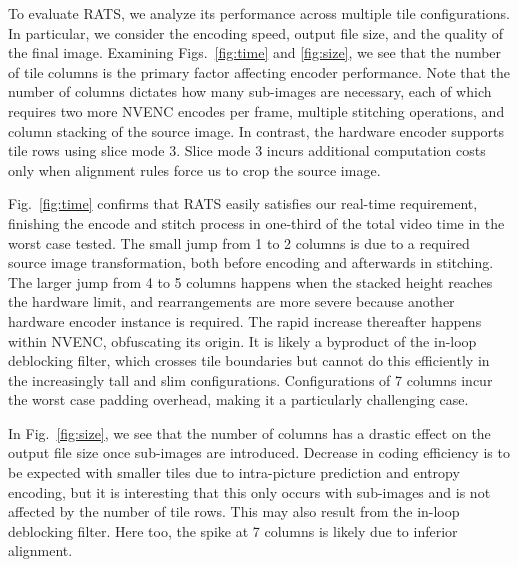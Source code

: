 To evaluate RATS, we analyze its performance across multiple tile configurations. In particular, we consider the encoding speed, output file size, and the quality of the final image.
%
Examining Figs.~\ref{fig:time} and \ref{fig:size}, we see that the number of tile columns is the primary factor affecting encoder performance. Note that the number of columns dictates how many sub-images are necessary, each of which requires two more NVENC encodes per frame, multiple stitching operations, and column stacking of the source image. In contrast, the hardware encoder supports tile rows using slice mode 3. Slice mode 3 incurs additional computation costs only when alignment rules force us to crop the source image.

Fig.~\ref{fig:time} confirms that RATS easily satisfies our real-time requirement, finishing the encode and stitch process in one-third of the total video time in the worst case tested.
The small jump from 1 to 2 columns is due to a required source image transformation, both before encoding and afterwards in stitching.
The larger jump from 4 to 5 columns happens when the stacked height reaches the hardware limit, and rearrangements are more severe because another hardware encoder instance is required.
The rapid increase thereafter happens within NVENC, obfuscating its origin.
It is likely a byproduct of the in-loop deblocking filter, which crosses tile boundaries but cannot do this efficiently in the increasingly tall and slim configurations. Configurations of 7 columns incur the worst case padding overhead, making it a particularly challenging case.


In Fig.~\ref{fig:size}, we see that the number of columns has a drastic effect on the output file size once sub-images are introduced. Decrease in coding efficiency is to be expected with smaller tiles due to intra-picture prediction and entropy encoding, but it is interesting that this only occurs with sub-images and is not affected by the number of tile rows.
This may also result from the in-loop deblocking filter.
Here too, the spike at 7 columns is likely due to inferior alignment.

